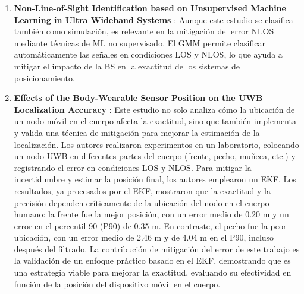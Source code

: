 \begin{enumerate}
    Los autores proponen una técnica de identificación NLOS basada en estadísticas del canal multitrayecto, como la curtosis, el retardo medio en exceso y la dispersión RMS del retardo, usando modelos de canal IEEE 802.15.4a como referencia. A partir de estas estadísticas, desarrollan una prueba conjunta de razón de verosimilitud para clasificar enlaces LOS/NLOS y un algoritmo de Mínimos Cuadrados Ponderados (WLS, \textit{Weighted Least Squares}) que utiliza dicha información para reducir el peso de mediciones NLOS. Los resultados se reportan mediante simulaciones y muestran mejoras frente a LS convencional. Por tanto, esta referencia se usa como antecedente metodológico de identificación y mitigación NLOS en UWB, no como estudio experimental de BS corporal.
    
    \item \textbf{Non-Line-of-Sight Identification based on Unsupervised Machine Learning in Ultra Wideband Systems} \cite{Fan2019}: Aunque este estudio se clasifica también como simulación, es relevante en la mitigación del error NLOS mediante técnicas de ML no supervisado. El GMM permite clasificar automáticamente las señales en condiciones LOS y NLOS, lo que ayuda a mitigar el impacto de la BS en la exactitud de los sistemas de posicionamiento.

    \item \textbf{Effects of the Body-Wearable Sensor Position on the UWB Localization Accuracy} \cite{ref4}: Este estudio no solo analiza cómo la ubicación de un nodo móvil en el cuerpo afecta la exactitud, sino que también implementa y valida una técnica de mitigación para mejorar la estimación de la localización. Los autores realizaron experimentos en un laboratorio, colocando un nodo UWB en diferentes partes del cuerpo (frente, pecho, muñeca, etc.) y registrando el error en condiciones LOS y NLOS. Para mitigar la incertidumbre y estimar la posición final, los autores emplearon un EKF. Los resultados, ya procesados por el EKF, mostraron que la exactitud y la precisión dependen críticamente de la ubicación del nodo en el cuerpo humano: la frente fue la mejor posición, con un error medio de 0.20 m y un error en el percentil 90 (P90) de 0.35 m. En contraste, el pecho fue la peor ubicación, con un error medio de 2.46 m y de 4.04 m en el P90, incluso después del filtrado. La contribución de mitigación del error de este trabajo es la validación de un enfoque práctico basado en el EKF, demostrando que es una estrategia viable para mejorar la exactitud, evaluando su efectividad en función de la posición del dispositivo móvil  en el cuerpo.


\end{enumerate}
